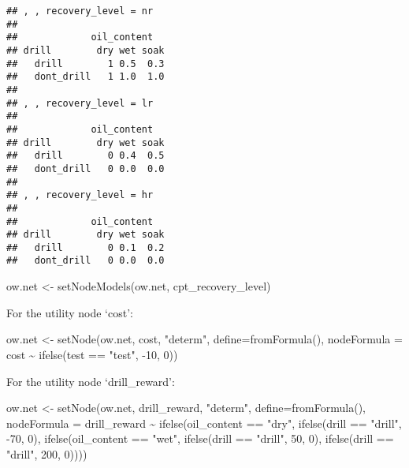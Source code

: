 \documentclass[
]{article}
\newenvironment{Shaded}{\begin{snugshade}}{\end{snugshade}}
\newcommand{\AttributeTok}[1]{\textcolor[rgb]{0.77,0.63,0.00}{#1}}
\newcommand{\DecValTok}[1]{\textcolor[rgb]{0.00,0.00,0.81}{#1}}
\newcommand{\FunctionTok}[1]{\textcolor[rgb]{0.00,0.00,0.00}{#1}}
\newcommand{\NormalTok}[1]{#1}
\newcommand{\OtherTok}[1]{\textcolor[rgb]{0.56,0.35,0.01}{#1}}
\newcommand{\SpecialCharTok}[1]{\textcolor[rgb]{0.00,0.00,0.00}{#1}}
\newcommand{\StringTok}[1]{\textcolor[rgb]{0.31,0.60,0.02}{#1}}
\begin{document}
\begin{verbatim}
## , , recovery_level = nr
## 
##             oil_content
## drill        dry wet soak
##   drill        1 0.5  0.3
##   dont_drill   1 1.0  1.0
## 
## , , recovery_level = lr
## 
##             oil_content
## drill        dry wet soak
##   drill        0 0.4  0.5
##   dont_drill   0 0.0  0.0
## 
## , , recovery_level = hr
## 
##             oil_content
## drill        dry wet soak
##   drill        0 0.1  0.2
##   dont_drill   0 0.0  0.0
\end{verbatim}

\begin{Shaded}
\begin{Highlighting}[]
\NormalTok{ow.net }\OtherTok{\textless{}{-}} \FunctionTok{setNodeModels}\NormalTok{(ow.net, cpt\_recovery\_level)}
\end{Highlighting}
\end{Shaded}

For the utility node `cost':

\begin{Shaded}
\begin{Highlighting}[]
\NormalTok{ow.net }\OtherTok{\textless{}{-}} \FunctionTok{setNode}\NormalTok{(ow.net, cost, }\StringTok{"determ"}\NormalTok{, }\AttributeTok{define=}\FunctionTok{fromFormula}\NormalTok{(),}
                  \AttributeTok{nodeFormula =}\NormalTok{ cost }\SpecialCharTok{\textasciitilde{}} \FunctionTok{ifelse}\NormalTok{(test }\SpecialCharTok{==} \StringTok{"test"}\NormalTok{, }\SpecialCharTok{{-}}\DecValTok{10}\NormalTok{, }\DecValTok{0}\NormalTok{))}
\end{Highlighting}
\end{Shaded}

For the utility node `drill\_reward':

\begin{Shaded}
\begin{Highlighting}[]
\NormalTok{ow.net }\OtherTok{\textless{}{-}} \FunctionTok{setNode}\NormalTok{(ow.net, drill\_reward, }\StringTok{"determ"}\NormalTok{, }\AttributeTok{define=}\FunctionTok{fromFormula}\NormalTok{(),}
                  \AttributeTok{nodeFormula =}\NormalTok{ drill\_reward }\SpecialCharTok{\textasciitilde{}} \FunctionTok{ifelse}\NormalTok{(oil\_content }\SpecialCharTok{==} \StringTok{"dry"}\NormalTok{,}
                                                      \FunctionTok{ifelse}\NormalTok{(drill }\SpecialCharTok{==} \StringTok{"drill"}\NormalTok{, }\SpecialCharTok{{-}}\DecValTok{70}\NormalTok{, }\DecValTok{0}\NormalTok{),}
                                                      \FunctionTok{ifelse}\NormalTok{(oil\_content }\SpecialCharTok{==} \StringTok{"wet"}\NormalTok{,}
                                                             \FunctionTok{ifelse}\NormalTok{(drill }\SpecialCharTok{==} \StringTok{"drill"}\NormalTok{, }\DecValTok{50}\NormalTok{, }\DecValTok{0}\NormalTok{),}
                                                             \FunctionTok{ifelse}\NormalTok{(drill }\SpecialCharTok{==} \StringTok{"drill"}\NormalTok{, }\DecValTok{200}\NormalTok{, }\DecValTok{0}\NormalTok{))))}
\end{Highlighting}
\end{Shaded}
\end{document}
